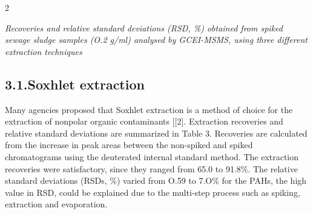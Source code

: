 \documentclass{article}
\begin{document}
\begin{paracol}{2}
\begin{center}
\end{center}


\textit{Recoveries and relative standard deviations (RSD, \%) obtained from spiked
sewage sludge samples (O.2 g/ml) analysed by GCEI-MSMS, using three
different extraction techniques}


\subsection*{3.1.Soxhlet extraction}


Many agencies proposed that Soxhlet extraction is a
method of choice for the extraction of nonpolar organic contaminants [[2]. Extraction recoveries and relative standard
deviations are summarized in Table 3.
Recoveries are calculated from the increase in peak areas
between the non-spiked and spiked chromatograms using the
deuterated internal standard method. The extraction recoveries were satisfactory, since they ranged from 65.0 to 91.8\%.
The relative standard deviations (RSDs, \%) varied from O.59
to 7.O\% for the PAHs, the high value in RSD, could be
explained due to the multi-step process such as spiking,
extraction and evaporation.



\end{paracol}
\end{document}
